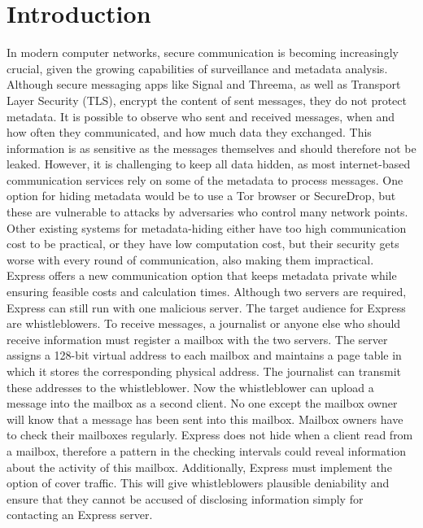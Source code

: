\documentclass[a4paper]{article}
\begin{document}
\section{Introduction}
\label{sec:intro}
In modern computer networks, secure communication is becoming increasingly crucial, given the growing capabilities of surveillance and metadata analysis. Although secure messaging apps like Signal and Threema, as well as Transport Layer Security (TLS), encrypt the content of sent messages, they do not protect metadata. It is possible to observe who sent and received messages, when and how often they communicated, and how much data they exchanged. This information is as sensitive as the messages themselves and should therefore not be leaked. However, it is challenging to keep all data hidden, as most internet-based communication services rely on some of the metadata to process messages. One option for hiding metadata would be to use a Tor browser or SecureDrop, but these are vulnerable to attacks by adversaries who control many network points.  Other existing systems for metadata-hiding either have too high communication cost to be practical, or they have low computation cost, but their security gets worse with every round of communication, also making them impractical.\\
Express \citep{Eskandarian2021} offers a new communication option that keeps metadata private while ensuring feasible costs and calculation times. Although two servers are required, Express can still run with one malicious server. 
The target audience for Express are whistleblowers. To receive messages, a journalist or anyone else who should receive information must register a mailbox with the two servers. The server assigns a 128-bit virtual address to each mailbox and maintains a page table in which it stores the corresponding physical address. The journalist can transmit these addresses to the whistleblower. Now the whistleblower can upload a message into the mailbox as a second client. No one except the mailbox owner will know that a message has been sent into this mailbox. Mailbox owners have to check their mailboxes regularly. Express does not hide when a client read from a mailbox, therefore a pattern in the checking intervals could reveal information about the activity of this mailbox. Additionally, Express must implement the option of cover traffic.  This will give whistleblowers plausible deniability and ensure that they cannot be accused of disclosing information simply for contacting an Express server. \\
\end{document}
